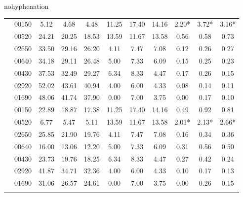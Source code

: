 \begin{hyphenrules}{nohyphenation}
\begin{table}[H]
{\begin{tabular}{>{\raggedleft\arraybackslash}p{4cm} lccCccCccc}
            \midrule
             & 00150 & 5.12 & 4.68 & 4.48 & 11.25 & 17.40 & 14.16 & 2.20* & 3.72* & 3.16*
 \\
            & 00520 &                       24.21 & 20.25 & 18.53 &     13.59 & 11.67 & 13.58 & 0.56 & 0.58 & 0.73 \\
            & 02650 &                       33.50 & 29.16 & 26.20 &     4.11 & 7.47 & 7.08 &    0.12 & 0.26 & 0.27 \\
            & 00640 &                       34.18 & 29.11 & 26.48 &     5.00 & 7.33 & 6.09 &    0.15 & 0.25 & 0.23 \\
            & 00430 &                       37.53 & 32.49 & 29.27 &     6.34 & 8.33 & 4.47 &    0.17 & 0.26 & 0.15 \\
            & 02920 &                       52.02 & 43.61 & 40.94 &     4.00 & 6.00 & 4.33 &    0.08 & 0.14 & 0.11 \\
            & 01690 &                       48.06 & 41.74 & 37.90 &     0.00 & 7.00 & 3.75 &    0.00 & 0.17 & 0.10 \\
            \midrule
            
             & 00150 & 22.89 & 18.87 & 17.38 & 11.25 & 17.40 & 14.16 & 0.49 & 0.92 & 0.81 \\
            & 00520 &                       6.77 & 5.47 & 5.11 &        13.59 & 11.67 & 13.58 & 2.01* & 2.13* & 2.66* \\
            & 02650 &                       25.85 & 21.90 & 19.76 &     4.11 & 7.47 & 7.08 &    0.16 & 0.34 & 0.36 \\
            & 00640 &                       16.00 & 13.06 & 12.20 &     5.00 & 7.33 & 6.09 &    0.31 & 0.56 & 0.50 \\
            & 00430 &                       23.73 & 19.76 & 18.25 &     6.34 & 8.33 & 4.47 &    0.27 & 0.42 & 0.24 \\
            & 02920 &                       41.87 & 34.71 & 32.36 &     4.00 & 6.00 & 4.33 &    0.10 & 0.17 & 0.13 \\
            & 01690 &                       31.06 & 26.57 & 24.61 &     0.00 & 7.00 & 3.75 &    0.00 & 0.26 & 0.15 \\
            \midrule
            

\end{tabular}}
\end{table}
\end{hyphenrules}
